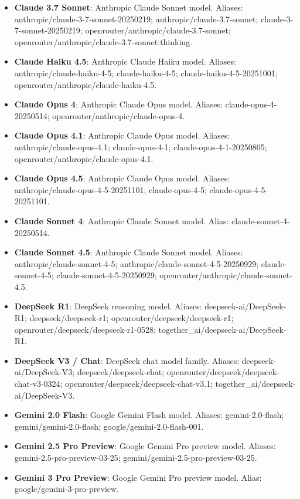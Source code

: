\begingroup
\footnotesize
\begin{itemize}
\item \textbf{Claude 3.7 Sonnet}: Anthropic Claude Sonnet model. Aliases: anthropic/claude-3-7-sonnet-20250219; anthropic/claude-3.7-sonnet; claude-3-7-sonnet-20250219; openrouter/anthropic/claude-3.7-sonnet; openrouter/anthropic/claude-3.7-sonnet:thinking.
\item \textbf{Claude Haiku 4.5}: Anthropic Claude Haiku model. Aliases: anthropic/claude-haiku-4-5; claude-haiku-4-5; claude-haiku-4-5-20251001; openrouter/anthropic/claude-haiku-4.5.
\item \textbf{Claude Opus 4}: Anthropic Claude Opus model. Aliases: claude-opus-4-20250514; openrouter/anthropic/claude-opus-4.
\item \textbf{Claude Opus 4.1}: Anthropic Claude Opus model. Aliases: anthropic/claude-opus-4.1; claude-opus-4-1; claude-opus-4-1-20250805; openrouter/anthropic/claude-opus-4.1.
\item \textbf{Claude Opus 4.5}: Anthropic Claude Opus model. Aliases: anthropic/claude-opus-4-5-20251101; claude-opus-4-5; claude-opus-4-5-20251101.
\item \textbf{Claude Sonnet 4}: Anthropic Claude Sonnet model. Alias: claude-sonnet-4-20250514.
\item \textbf{Claude Sonnet 4.5}: Anthropic Claude Sonnet model. Aliases: anthropic/claude-sonnet-4-5; anthropic/claude-sonnet-4-5-20250929; claude-sonnet-4-5; claude-sonnet-4-5-20250929; openrouter/anthropic/claude-sonnet-4.5.
\item \textbf{DeepSeek R1}: DeepSeek reasoning model. Aliases: deepseek-ai/DeepSeek-R1; deepseek/deepseek-r1; openrouter/deepseek/deepseek-r1; openrouter/deepseek/deepseek-r1-0528; together\_ai/deepseek-ai/DeepSeek-R1.
\item \textbf{DeepSeek V3 / Chat}: DeepSeek chat model family. Aliases: deepseek-ai/DeepSeek-V3; deepseek/deepseek-chat; openrouter/deepseek/deepseek-chat-v3-0324; openrouter/deepseek/deepseek-chat-v3.1; together\_ai/deepseek-ai/DeepSeek-V3.
\item \textbf{Gemini 2.0 Flash}: Google Gemini Flash model. Aliases: gemini-2.0-flash; gemini/gemini-2.0-flash; google/gemini-2.0-flash-001.
\item \textbf{Gemini 2.5 Pro Preview}: Google Gemini Pro preview model. Aliases: gemini-2.5-pro-preview-03-25; gemini/gemini-2.5-pro-preview-03-25.
\item \textbf{Gemini 3 Pro Preview}: Google Gemini Pro preview model. Alias: google/gemini-3-pro-preview.

\end{itemize}
